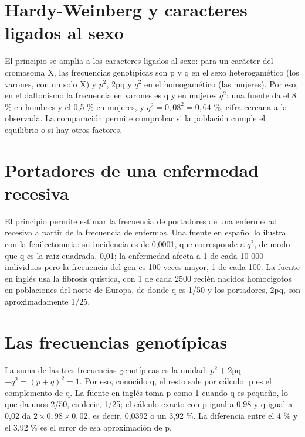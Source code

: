 \documentclass{book}
\begin{document}

\section{Hardy-Weinberg y caracteres ligados al sexo}

El principio se amplía a los caracteres ligados al sexo: para un carácter del cromosoma X, las frecuencias genotípicas son p y q en el sexo heterogamético (los varones, con un solo X) y \(p^{2}\), 2pq y \(q^{2}\) en el homogamético (las mujeres). Por eso, en el daltonismo la frecuencia en varones es q y en mujeres \(q^{2}\): una fuente da el 8 \% en hombres y el 0,5 \% en mujeres, y \(q^{2} = 0,08^{2} = 0,64\) \%, cifra cercana a la observada. La comparación permite comprobar si la población cumple el equilibrio o si hay otros factores.


\section{Portadores de una enfermedad recesiva}

El principio permite estimar la frecuencia de portadores de una enfermedad recesiva a partir de la frecuencia de enfermos. Una fuente en español lo ilustra con la fenilcetonuria: su incidencia es de 0,0001, que corresponde a \(q^{2}\), de modo que q es la raíz cuadrada, 0,01; la enfermedad afecta a 1 de cada 10 000 individuos pero la frecuencia del gen es 100 veces mayor, 1 de cada 100. La fuente en inglés usa la fibrosis quística, con 1 de cada 2500 recién nacidos homocigotos en poblaciones del norte de Europa, de donde q es 1/50 y los portadores, 2pq, son aproximadamente 1/25.


\section{Las frecuencias genotípicas}

La suma de las tres frecuencias genotípicas es la unidad: \(p^{2} + 2\)pq \(+ q^{2} = (p + q)^{2} = 1\). Por eso, conocido q, el resto sale por cálculo: p es el complemento de q. La fuente en inglés toma p como 1 cuando q es pequeño, lo que da unos 2/50, es decir, 1/25; el cálculo exacto con p igual a 0,98 y q igual a 0,02 da \(2 \times 0,98 \times 0,02\), es decir, 0,0392 o un 3,92 \%. La diferencia entre el 4 \% y el 3,92 \% es el error de esa aproximación de p.
\end{document}
